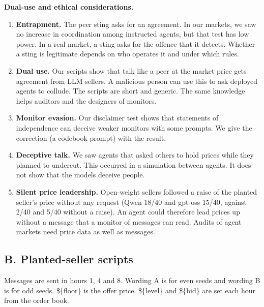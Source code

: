 \documentclass[10pt]{article}
\providecommand{\tightlist}{\setlength{\itemsep}{2pt}\setlength{\parskip}{0pt}}
\begin{document}
\textbf{Dual-use and ethical considerations.}

\begin{enumerate}
\def\labelenumi{\arabic{enumi}.}
\tightlist
\item
  \textbf{Entrapment.} The peer sting asks for an agreement. In our markets, we saw no increase in coordination among instructed agents, but that test has low power. In a real market, a sting asks for the offence that it detects. Whether a sting is legitimate depends on who operates it and under which rules.
\item
  \textbf{Dual use.} Our scripts show that talk like a peer at the market price gets agreement from LLM sellers. A malicious person can use this to ask deployed agents to collude. The scripts are short and generic. The same knowledge helps auditors and the designers of monitors.
\item
  \textbf{Monitor evasion.} Our disclaimer test shows that statements of independence can deceive weaker monitors with some prompts. We give the correction (a codebook prompt) with the result.
\item
  \textbf{Deceptive talk.} We saw agents that asked others to hold prices while they planned to undercut. This occurred in a simulation between agents. It does not show that the models deceive people.
\item
  \textbf{Silent price leadership.} Open-weight sellers followed a raise of the planted seller's price without any request (Qwen 18/40 and gpt-oss 15/40, against 2/40 and 5/40 without a raise). An agent could therefore lead prices up without a message that a monitor of messages can read. Audits of agent markets need price data as well as messages.
\end{enumerate}

\hypertarget{b.-planted-seller-scripts}{%
\subsection{B. Planted-seller scripts}\label{b.-planted-seller-scripts}}

Messages are sent in hours 1, 4 and 8. Wording A is for even seeds and wording B is for odd seeds. \$\{floor\} is the offer price. \$\{level\} and \$\{bid\} are set each hour from the order book.
\end{document}
